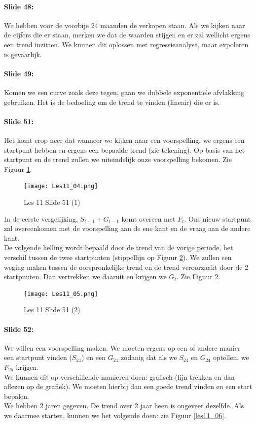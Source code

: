 \documentclass[10pt,a4paper]{report}
\begin{document}
\paragraph{Slide 48:} We hebben voor de voorbije 24 maanden de verkopen staan. Als we kijken naar de cijfers die er staan, merken we dat de waarden stijgen en er zal wellicht ergens een trend inzitten. We kunnen dit oplossen met regressieanalyse, maar expoleren is gevaarlijk.

\paragraph{Slide 49:} Komen we een curve zoals deze tegen, gaan we dubbele exponenti\"ele afvlakking gebruiken. Het is de bedoeling om de trend te vinden (lineair) die er is.

\paragraph{Slide 51:} Het komt erop neer dat wanneer we kijken naar een voorspelling, we ergens een startpunt hebben en ergens een bepaalde trend (zie tekening). Op basis van het startpunt en de trend zullen we uiteindelijk onze voorspelling bekomen. Zie Figuur \ref{les11_04}.\\

\begin{figure}[h!]
\centering
\texttt{[image: Les11\_04.png]}
\caption{Les 11 Slide 51 (1)} 
\label{les11_04}
\end{figure}

In de eerste vergelijking, $S_{t-1} + G_{t-1}$ komt overeen met $F_{t}$. Ons nieuw startpunt zal overeenkomen met de voorspelling aan de ene kant en de vraag aan de andere kant.\\
De volgende helling wordt bepaald door de trend van de vorige periode, het verschil tussen de twee startpunten (stippellijn op Figuur \ref{les11_05}). We zullen een weging maken tussen de oorspronkelijke trend en de trend veroorzaakt door de 2 startpunten. Dan vertrekken we daaruit en krijgen we $G_{t}$. Zie Figuur \ref{les11_05}.

\begin{figure}[h!]
\centering
\texttt{[image: Les11\_05.png]}
\caption{Les 11 Slide 51 (2)} 
\label{les11_05}
\end{figure}

\paragraph{Slide 52:} We willen een voorspelling maken. We moeten ergens op een of andere manier een startpunt vinden ($S_{24}$) en een $G_{24}$ zodanig dat als we $S_{24}$ en $G_{24}$ optellen, we $F_{25}$ krijgen.\\
We kunnen dit op verschillende manieren doen: grafisch (lijn trekken en dan aflezen op de grafiek). We moeten hierbij dan een goede trend vinden en een start bepalen.\\
We hebben 2 jaren gegeven. De trend over 2 jaar heen is ongeveer dezelfde. Als we daarmee starten, kunnen we het volgende doen: zie Figuur \ref{les11_06}.\\
\end{document}
